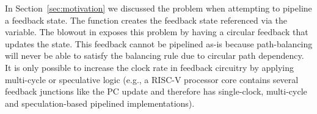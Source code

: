 In Section~\ref{sec:motivation} we discussed the problem when attempting to pipeline a feedback state. The  function creates the feedback state referenced via the  variable. The  blowout in  exposes this problem by having a circular feedback that updates the  state. This feedback cannot be pipelined as-is because path-balancing will never be able to satisfy the balancing rule due to circular path dependency. It is only possible to increase the clock rate in feedback circuitry by applying multi-cycle or speculative logic (e.g., a RISC-V processor core contains several feedback junctions like the PC update and therefore has single-clock, multi-cycle and speculation-based pipelined implementations). 
